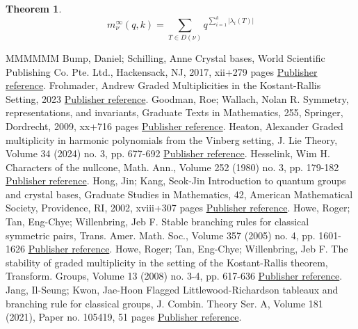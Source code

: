 \documentclass[11pt]{article}
\newtheorem{thm}[theo]{Theorem}
\theoremstyle{definition}
\numberwithin{equation}{section}
\begin{document}
\begin{thm}\label{thm:main}
     $$m_\nu^\infty(q,k) = \sum_{T \in D(\nu)} q^{\sum_{i=1}^k |\lambda_i(T)|}$$
\end{thm}

\begin{thebibliography}{MMMMMM}
 Bump, Daniel; Schilling, Anne Crystal bases, World Scientific Publishing Co. Pte. Ltd., Hackensack, NJ, 2017, xii+279 pages \href{https://alco.centre-mersenne.org/articles/10.5802/alco.391/#BumpSchilling2017}{Publisher reference}.
 Frohmader, Andrew Graded Multiplicities in the Kostant-Rallis Setting, 2023 \href{https://alco.centre-mersenne.org/articles/10.5802/alco.391/#frohmader2023graded}{Publisher reference}.
 Goodman, Roe; Wallach, Nolan R. Symmetry, representations, and invariants, Graduate Texts in Mathematics, 255, Springer, Dordrecht, 2009, xx+716 pages \href{https://alco.centre-mersenne.org/articles/10.5802/alco.391/#GoodmanWallach2009}{Publisher reference}.
 Heaton, Alexander Graded multiplicity in harmonic polynomials from the Vinberg setting, J. Lie Theory, Volume 34 (2024) no. 3, pp. 677-692 \href{https://alco.centre-mersenne.org/articles/10.5802/alco.391/#heaton2023graded}{Publisher reference}.
 Hesselink, Wim H. Characters of the nullcone, Math. Ann., Volume 252 (1980) no. 3, pp. 179-182 \href{https://alco.centre-mersenne.org/articles/10.5802/alco.391/#Hesselink1980}{Publisher reference}.
 Hong, Jin; Kang, Seok-Jin Introduction to quantum groups and crystal bases, Graduate Studies in Mathematics, 42, American Mathematical Society, Providence, RI, 2002, xviii+307 pages \href{https://alco.centre-mersenne.org/articles/10.5802/alco.391/#HongKang2002}{Publisher reference}.
 Howe, Roger; Tan, Eng-Chye; Willenbring, Jeb F. Stable branching rules for classical symmetric pairs, Trans. Amer. Math. Soc., Volume 357 (2005) no. 4, pp. 1601-1626 \href{https://alco.centre-mersenne.org/articles/10.5802/alco.391/#HoweTanWillenbring2005}{Publisher reference}.
 Howe, Roger; Tan, Eng-Chye; Willenbring, Jeb F. The stability of graded multiplicity in the setting of the Kostant-Rallis theorem, Transform. Groups, Volume 13 (2008) no. 3-4, pp. 617-636 \href{https://alco.centre-mersenne.org/articles/10.5802/alco.391/#HoweTanWillenbring2008}{Publisher reference}.
 Jang, Il-Seung; Kwon, Jae-Hoon Flagged Littlewood-Richardson tableaux and branching rule for classical groups, J. Combin. Theory Ser. A, Volume 181 (2021), Paper no. 105419, 51 pages \href{https://alco.centre-mersenne.org/articles/10.5802/alco.391/#KwonJang2021}{Publisher reference}.

\end{thebibliography}
\end{document}
